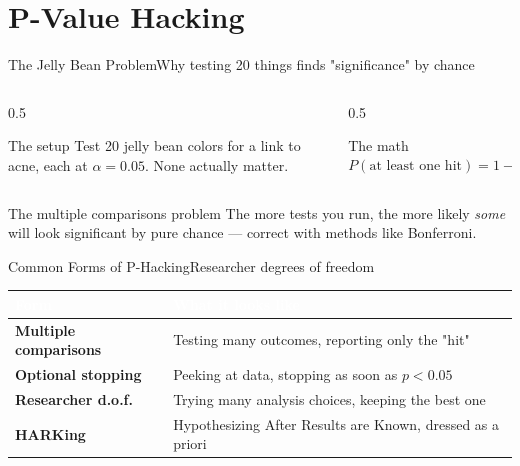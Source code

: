 \documentclass[aspectratio=169,11pt]{beamer}
\begin{document}
\section{P-Value Hacking}

\begin{frame}{The Jelly Bean Problem}{Why testing 20 things finds "significance" by chance}
  \begin{columns}[T]
    \begin{column}{0.5\textwidth}
      \begin{alertblock}{The setup}
        \small Test 20 jelly bean colors for a link to acne, each at
        $\alpha=0.05$. None actually matter.
      \end{alertblock}
    \end{column}
    \begin{column}{0.5\textwidth}
      \begin{exampleblock}{The math}
        \footnotesize
        \[ P(\text{at least one hit}) = 1-(1-0.05)^{20} \approx 0.64 \]
      \end{exampleblock}
    \end{column}
  \end{columns}
  \vfill
  \begin{block}{The multiple comparisons problem}
    \small The more tests you run, the more likely \emph{some} will look
    significant by pure chance — correct with methods like Bonferroni.
  \end{block}
\end{frame}

\begin{frame}{Common Forms of P-Hacking}{Researcher degrees of freedom}
  \small
  \renewcommand{\arraystretch}{1.3}
  \begin{center}
  \begin{tabularx}{\textwidth}{@{}>{\bfseries}l >{\raggedright\arraybackslash}X@{}}
    \toprule
    \rowcolor{PrimaryDark}
    \textcolor{white}{Form} & \textcolor{white}{What it looks like} \\
    \midrule
    Multiple comparisons & Testing many outcomes, reporting only the "hit" \\
    \rowcolor{PrimaryLight!25}
    Optional stopping & Peeking at data, stopping as soon as $p<0.05$ \\
    Researcher d.o.f.\ & Trying many analysis choices, keeping the best one \\
    \rowcolor{PrimaryLight!25}
    HARKing & Hypothesizing After Results are Known, dressed as a priori \\
    \bottomrule
  \end{tabularx}
  \end{center}
\end{frame}
\end{document}
